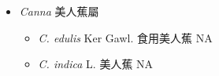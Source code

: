 
  \begin{itemize}
 \item[] \textit{Canna} 美人蕉屬
                                
  \begin{itemize}
        \item[] \textit{C. edulis} Ker Gawl.  食用美人蕉   NA
        \item[] \textit{C. indica} L.  美人蕉   NA
  \end{itemize}
  \end{itemize}
